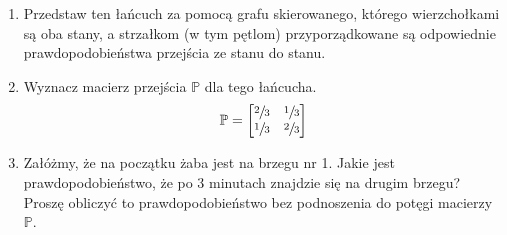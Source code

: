 \documentclass[a4paper,12pt]{article}
\theoremstyle{definition}%
\theoremstyle{definition}
\theoremstyle{problem}
\begin{document}
\begin{enumerate}[label=\alph*)]
\item Przedstaw ten łańcuch za pomocą grafu skierowanego, którego wierzchołkami są oba stany, a strzałkom (w tym pętlom) przyporządkowane są odpowiednie prawdopodobieństwa przejścia ze stanu do stanu.

\begin{figure}[H]
\centering
{}
\end{figure}
\item Wyznacz macierz przejścia $\mathbb{P}$ dla tego łańcucha.
$$\mathbb{P}=\begin{bmatrix}
\sfrac{2}{3}&\sfrac{1}{3}\\
\sfrac{1}{3}&\sfrac{2}{3}
\end{bmatrix}$$
\item Załóżmy, że na początku żaba jest na brzegu nr 1. Jakie jest prawdopodobieństwo, że po 3 minutach znajdzie się na drugim brzegu? Proszę obliczyć to prawdopodobieństwo bez podnoszenia do potęgi macierzy $\mathbb{P}$.


\end{enumerate}
\end{document}

